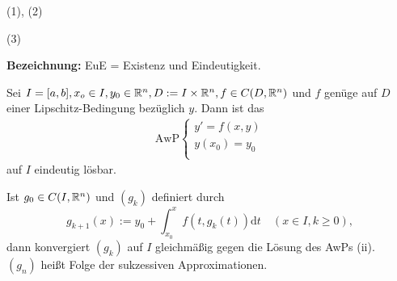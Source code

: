 \documentclass[a4paper,oneside,DIV15,BCOR12mm,chapterprefix=true,headings=onelinechapter]{scrbook}
\begin{document}
\begin{beweis}
(1), (2) 

(3) 
\end{beweis}

\textbf{Bezeichnung:} EuE = Existenz und Eindeutigkeit.
\begin{satz}
Sei $I = [a,b], x_o \in I, y_0 \in \mathbb{R}^n, D:= I \times \mathbb{R}^n, f\in C(D, \mathbb{R}^n)$ und $f$ genüge auf $D$ einer Lipschitz-Bedingung bezüglich $y$. Dann ist das
\begin{align*}\text{AwP}
\begin{cases}
y'=f(x,y)\\
y(x_0) = y_0\\
\end{cases}
\tag{ii}
\end{align*}
auf $I$ eindeutig lösbar.

Ist $g_0 \in C(I, \mathbb{R}^n)$ und $(g_k)$ definiert durch
\[ g_{k+1}(x) := y_0 + \int_{x_0}^x f(t, g_k(t)) \text{d}t \quad (x \in I, k \geq 0), \]
dann konvergiert $(g_k)$ auf $I$ gleichmäßig gegen die Lösung des AwPs (ii).\\
$(g_n)$ heißt Folge der sukzessiven Approximationen.
\end{satz}
\end{document}
